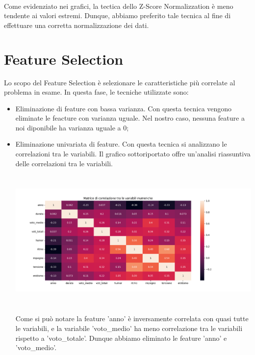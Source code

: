 \documentclass[a4paper, 10pt]{report}
\begin{document}
            \\Come evidenziato nei grafici, la tectica dello Z-Score Normalizzation è meno tendente ai valori estremi.
            Dunque, abbiamo preferito tale tecnica al fine di effettuare una corretta normalizzazione dei dati.

        \section{Feature Selection}\label{sec:feature-selection}
            Lo scopo del Feature Selection è selezionare le caratteristiche più correlate al problema in esame.
            In questa fase, le tecniche utilizzate sono:
            \begin{itemize}
                \item Eliminazione di feature con bassa varianza. Con questa tecnica vengono eliminate le feacture
                con varianza uguale. Nel nostro caso, nessuna feature a noi diponibile ha varianza uguale a 0;
                \item Eliminazione univariata di feature. Con questa tecnica si analizzano le correlazioni tra le variabili.
                Il grafico sottoriportato offre un'analisi riassuntiva delle correlazioni tra le variabili.
                \begin{center}
                    \includegraphics[width=13cm, height=7cm]{dataPreparation/matriceCorrelazione.png}\\
                \end{center}
                Come si può notare la feature 'anno' è inversamente correlata con quasi tutte le variabili, e la variabile
                'voto\_medio' ha meno correlazione tra le variabili rispetto a 'voto\_totale'.
                Dunque abbiamo eliminato le feature 'anno' e 'voto\_medio'.
            \end{itemize}
\end{document}
